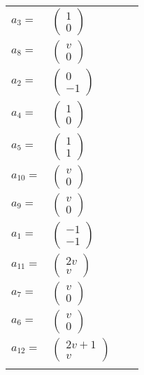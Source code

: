 \documentclass[1p]{elsarticle_modified}
\theoremstyle{definition}
\begin{document}
\begin{tabular}{m{7pt} m{180pt} m{7pt} m{180pt} }
\flushright $a_{3}=$&$\begin{pmatrix}1\\0\end{pmatrix}$ \\
\flushright $a_{8}=$&$\begin{pmatrix}v\\0\end{pmatrix}$ \\
\flushright $a_{2}=$&$\begin{pmatrix}0\\-1\end{pmatrix}$ \\
\flushright $a_{4}=$&$\begin{pmatrix}1\\0\end{pmatrix}$ \\
\flushright $a_{5}=$&$\begin{pmatrix}1\\1\end{pmatrix}$ \\
\flushright $a_{10}=$&$\begin{pmatrix}v\\0\end{pmatrix}$ \\
\flushright $a_{9}=$&$\begin{pmatrix}v\\0\end{pmatrix}$ \\
\flushright $a_{1}=$&$\begin{pmatrix}-1\\-1\end{pmatrix}$ \\
\flushright $a_{11}=$&$\begin{pmatrix}2 v\\v\end{pmatrix}$ \\
\flushright $a_{7}=$&$\begin{pmatrix}v\\0\end{pmatrix}$ \\
\flushright $a_{6}=$&$\begin{pmatrix}v\\0\end{pmatrix}$ \\
\flushright $a_{12}=$&$\begin{pmatrix}2 v+1\\v\end{pmatrix}$\\&\end{tabular}
\end{document}
